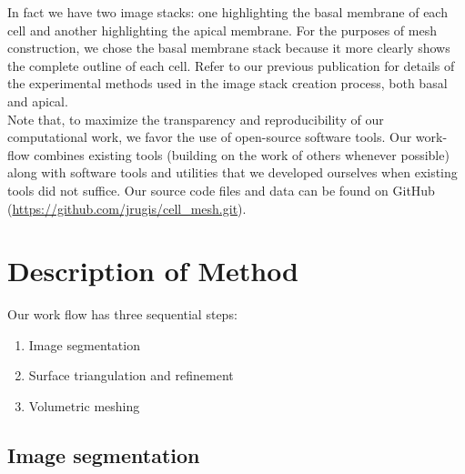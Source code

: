 \documentclass[a4paper,10pt]{article}
\begin{document}
In fact we have two image stacks: one highlighting the basal membrane of each cell and another highlighting the apical membrane. For the purposes of mesh construction, we chose the basal membrane stack because it more clearly shows the complete outline of each cell.
Refer to our previous publication \cite{Sneyd2017383} for details of the experimental methods used in the image stack creation process, both basal and apical.\\ 

Note that, to maximize the transparency and reproducibility of our computational work, we favor the use of open-source software tools. Our work-flow combines existing tools (building on the work of others whenever possible) along with software tools and utilities that we developed ourselves when existing tools did not suffice. Our source code files and data can be found on GitHub (\url{https://github.com/jrugis/cell_mesh.git}).\\

\section{Description of Method}

Our work flow has three sequential steps:
\begin{enumerate}
\item Image segmentation
\item Surface triangulation and refinement
\item Volumetric meshing
\end{enumerate}

\subsection{Image segmentation}
\end{document}
